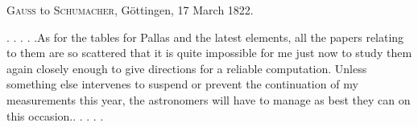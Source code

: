 \par{}\bigskip
\begin{center}
\textsc{Gauss} to \textsc{Schumacher}, Göttingen, 17 March 1822.
\end{center}
\noindent\hspace*{\parindent}. . . . .\quad As for the tables for Pallas and the latest elements, all the papers relating to them are so scattered that it is quite impossible for me just now to study them again closely enough to give directions for a reliable computation. Unless something else intervenes to suspend or prevent the continuation of my measurements this year, the astronomers will have to manage as best they can on this occasion.\quad . . . . .
\par
